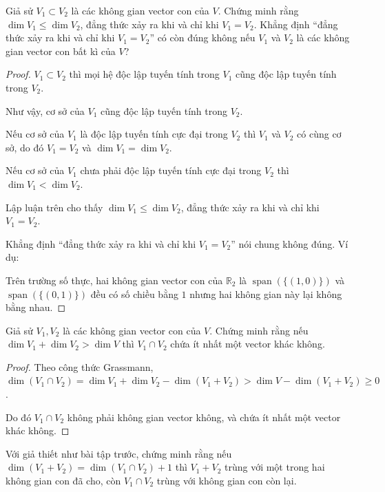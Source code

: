 \begin{exercise}
    Giả sử $V_{1}\subset V_{2}$ là các không gian vector con của $V$. Chứng minh rằng $\dim V_{1} \le \dim V_{2}$, đẳng thức xảy ra khi và chỉ khi $V_{1} = V_{2}$. Khẳng định ``đẳng thức xảy ra khi và chỉ khi $V_{1} = V_{2}$'' có còn đúng không nếu $V_{1}$ và $V_{2}$ là các không gian vector con bất kì của $V$?
\end{exercise}

\begin{proof}
    $V_{1}\subset V_{2}$ thì mọi hệ độc lập tuyến tính trong $V_{1}$ cũng độc lập tuyến tính trong $V_{2}$.

    Như vậy, cơ sở của $V_{1}$ cũng độc lập tuyến tính trong $V_{2}$.
    
    Nếu cơ sở của $V_{1}$ là độc lập tuyến tính cực đại trong $V_{2}$ thì $V_{1}$ và $V_{2}$ có cùng cơ sở, do đó $V_{1} = V_{2}$ và $\dim V_{1} = \dim V_{2}$.
    
    Nếu cơ sở của $V_{1}$ chưa phải độc lập tuyến tính cực đại trong $V_{2}$ thì $\dim V_{1} < \dim V_{2}$.
    
    Lập luận trên cho thấy $\dim V_{1} \le \dim V_{2}$, đẳng thức xảy ra khi và chỉ khi $V_{1} = V_{2}$.
    
    Khẳng định ``đẳng thức xảy ra khi và chỉ khi $V_{1} = V_{2}$'' nói chung không đúng. Ví dụ:
    
    Trên trường số thực, hai không gian vector con của $\mathbb{R}_{2}$ là $\operatorname{span}(\{ (1,0) \})$ và $\operatorname{span}(\{ (0,1) \})$ đều có số chiều bằng $1$ nhưng hai không gian này lại không bằng nhau.
\end{proof}

\begin{exercise}
    Giả sử $V_{1}, V_{2}$ là các không gian vector con của $V$. Chứng minh rằng nếu $\dim V_{1} + \dim V_{2} > \dim V$ thì $V_{1}\cap V_{2}$ chứa ít nhất một vector khác không.
\end{exercise}

\begin{proof}
    Theo công thức Grassmann, $\dim (V_{1}\cap V_{2}) = \dim V_{1} + \dim V_{2} - \dim (V_{1} + V_{2}) > \dim V - \dim (V_{1} + V_{2})\geq 0$. 
    
    Do đó $V_{1}\cap V_{2}$ không phải không gian vector không, và chứa ít nhất một vector khác không.
\end{proof}

\begin{exercise}
    Với giả thiết như bài tập trước, chứng minh rằng nếu $\dim(V_{1} + V_{2}) = \dim(V_{1}\cap V_{2}) + 1$ thì $V_{1} + V_{2}$ trùng với một trong hai không gian con đã cho, còn $V_{1}\cap V_{2}$ trùng với không gian con còn lại.
\end{exercise}

